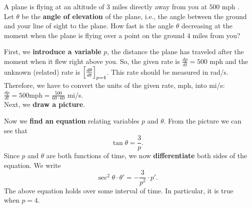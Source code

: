 \documentclass{ximera}
\begin{document}
\author{Nela Lakos}
\begin{example}
A plane is flying at an altitude of $3$ miles directly away from you at $500$ mph 
.  Let  $\theta$ be the \textbf{angle of elevation} of the plane, i.e., the angle between the ground and your line of  sight to the plane.
How fast is the angle $\theta$  decreasing at
the moment when the plane is flying over a point on the ground $4$
miles from you?


\begin{explanation}
 First, we \textbf{introduce a variable} $p$, the distance the plane has traveled after the moment when it flew right above you. 
 So, the given rate is $\frac{dp}{dt}=500$ mph and the unknown (related) rate is $\Bigl [\frac{d\theta}{dt}\Bigr]_{p=4}$.
  This rate should be measured in rad/s.
  Therefore, we have to convert the units of the given rate, mph, into mi/s:
    $\frac{dp}{dt}=500$mph$=\frac{500}{60\cdot60}$ mi/s. \\
Next, we \textbf{draw a picture}.
\begin{image}
\end{image}
Now we  \textbf{find an equation} relating variables $p$ and $\theta$.
From the picture we can see that
\[
\tan{\theta}=\frac{3}{p}.
\] 
Since  $p$ and $\theta$ are both functions of time, we now
\textbf{differentiate} both sides of the equation. We write
\[
\sec^{2}{\theta}\cdot\theta'  = -\frac{3}{p^2}\cdot p'.
\] 
The above equation holds over some interval of time. In particular, it is true when $p=4$.

\end{explanation}
\end{example}
\end{document}
